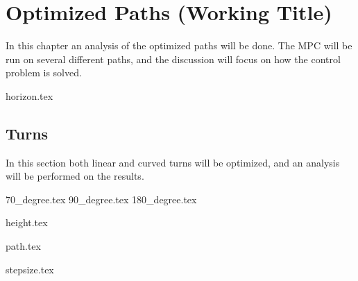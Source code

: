 \chapter{Optimized Paths (Working Title)}


In this chapter an analysis of the optimized paths will be done. The MPC will be run on several different paths, and the discussion will focus on how the control problem is solved.

{horizon.tex}

\section{Turns}

In this section both linear and curved turns will be optimized, and an analysis will be performed on the results.

{70_degree.tex}
{90_degree.tex}
{180_degree.tex}	

{height.tex}

{path.tex}

{stepsize.tex}